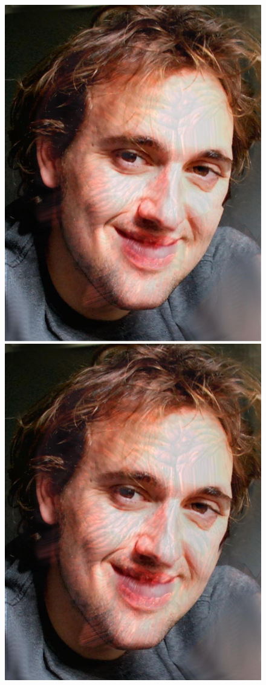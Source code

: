 \documentclass[11pt]{article}
\begin{document}
\begin{figure}[H]
\begin{center}
\includegraphics[scale=0.08]{figs/zombie/zombie_bf_05.jpg} 
\includegraphics[scale=0.08]{figs/zombie/zombie_bf_06.jpg} 

\end{center}
\end{figure}
\end{document}
